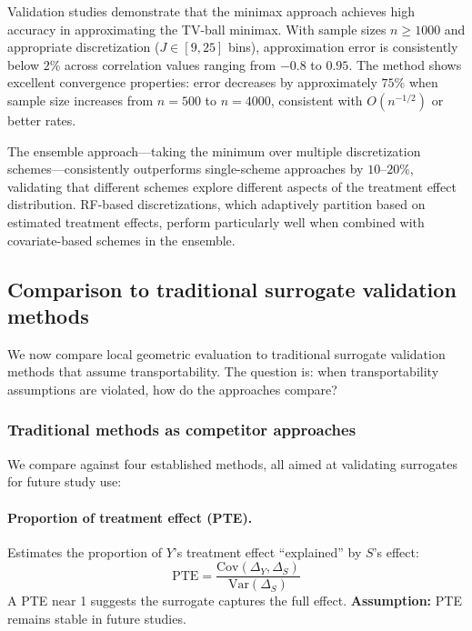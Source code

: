 \documentclass{article}
\begin{document}
Validation studies demonstrate that the minimax approach achieves high accuracy in approximating the TV-ball minimax. With sample sizes $n \geq 1000$ and appropriate discretization ($J \in [9, 25]$ bins), approximation error is consistently below $2\%$ across correlation values ranging from $-0.8$ to $0.95$. The method shows excellent convergence properties: error decreases by approximately $75\%$ when sample size increases from $n = 500$ to $n = 4000$, consistent with $O(n^{-1/2})$ or better rates.

The ensemble approach---taking the minimum over multiple discretization schemes---consistently outperforms single-scheme approaches by $10$--$20\%$, validating that different schemes explore different aspects of the treatment effect distribution. RF-based discretizations, which adaptively partition based on estimated treatment effects, perform particularly well when combined with covariate-based schemes in the ensemble.

\subsection{Comparison to traditional surrogate validation methods}\label{sec:comparison}

We now compare local geometric evaluation to traditional surrogate validation methods that assume transportability. The question is: when transportability assumptions are violated, how do the approaches compare?

\subsubsection{Traditional methods as competitor approaches}

We compare against four established methods, all aimed at validating surrogates for future study use:

\paragraph{Proportion of treatment effect (PTE).}
Estimates the proportion of $Y$'s treatment effect ``explained'' by $S$'s effect:
\begin{equation}
    \text{PTE} = \frac{\text{Cov}(\Delta_Y, \Delta_S)}{\text{Var}(\Delta_S)}
\end{equation}
A PTE near 1 suggests the surrogate captures the full effect. \textbf{Assumption:} PTE remains stable in future studies.
\end{document}
